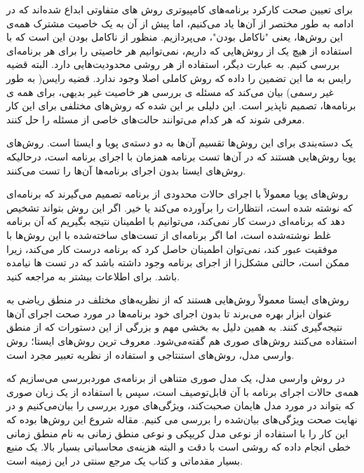 \documentclass[12pt]{report}
\begin{document}
برای تعیین صحت کارکرد برنامه‌های کامپیوتری روش های متفاوتی ابداع شده‌اند که در ادامه به طور مختصر از آن‌ها یاد می‌کنیم، اما پیش از آن به یک خاصیت مشترک همه‌ی این روش‌ها، یعنی "ناکامل بودن"، می‌پردازیم. منظور از ناکامل بودن این است که با استفاده از هیچ یک از روش‌هایی که داریم، نمی‌توانیم هر خاصیتی را برای هر برنامه‌ای بررسی کنیم. به عبارت دیگر، استفاده از هر روشی محدودیت‌هایی دارد. البته قضیه رایس  \cite{rice} به ما این تضمین را داده که روش کاملی اصلا وجود ندارد. قضیه رایس( به طور غیر رسمی) بیان می‌کند که مسئله ی بررسی هر خاصیت غیر بدیهی، برای همه ی برنامه‌ها، تصمیم ناپذیر است. این دلیلی بر این شده که روش‌های مختلفی برای این کار معرفی شوند که هر کدام می‌توانند حالت‌های خاصی از مسئله را حل کنند.

یک دسته‌بندی برای این روش‌ها تقسیم آن‌ها به دو دسته‌ی پویا و ایستا است. روش‌های پویا روش‌هایی هستند که در آن‌ها تست برنامه همزمان با اجرای برنامه است، درحالیکه روش‌های ایستا بدون اجرای برنامه‌ها آن‌ها را تست می‌کنند.

روش‌های پویا معمولاً با اجرای حالات محدودی از برنامه تصمیم می‌گیرند که برنامه‌ای که نوشته‌ شده است، انتظارات را برآورده می‌کند یا خیر. اگر این روش بتواند تشخیص دهد که برنامه‌ای درست کار نمی‌کند، می‌توانیم با اطمینان نتیجه بگیریم که آن برنامه غلط نوشته‌شده است، اما اگر برنامه‌ای از تست‌های ساخته‌شده با این روش‌ها با موفقیت عبور کند، نمی‌توان اطمینان حاصل کرد که برنامه درست کار می‌کند، زیرا ممکن است، حالتی مشکل‌زا از اجرای برنامه وجود داشته باشد که در تست ها نیامده باشد. برای اطلاعات بیشتر به \cite{art} مراجعه کنید.

روش‌های ایستا معمولاً روش‌هایی هستند که از نظریه‌های مختلف در منطق ریاضی به عنوان ابزار بهره می‌برند تا بدون اجرای خود برنامه‌ها در مورد صحت اجرای آن‌ها نتیجه‌گیری کنند. به همین دلیل به بخشی مهم و بزرگی از این دستورات که از منطق استفاده می‌کنند روش‌های صوری هم گفته‌می‌شود. معروف ترین روش‌های ایستا؛ روش وارسی‌ مدل، روش‌های استنتاجی و استفاده از نظریه تعبیر مجرد است.

در روش وارسی مدل، یک مدل صوری متناهی از برنامه‌ی موردبررسی می‌سازیم که  همه‌ی حالات اجرای برنامه با آن قابل‌توصیف است، سپس با استفاده از یک زبان صوری که بتواند در مورد مدل هایمان صحبت‌کند، ویژگی‌های مورد بررسی را بیان‌می‌کنیم و در نهایت صحت ویژگی‌های بیان‌شده را بررسی می کنیم. مقاله \cite{clarke} شروع این روش‌ها بوده که این کار را با استفاده از نوعی مدل کریپکی  \cite{kripke} و نوعی منطق زمانی به نام منطق زمانی خطی \cite{clarke} انجام داده که روشی است با دقت و البته هزینه‌ی محاسباتی بسیار بالا. \cite{logicincs} یک منبع بسیار مقدماتی و کتاب\cite{clarke2} یک مرجع سنتی در این زمینه است.
\end{document}
